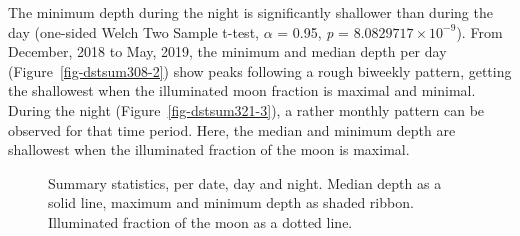 \documentclass[
  authoryear,
  review,
  3p]{elsarticle}
\begin{document}
The minimum depth during the night is significantly shallower than
during the day (one-sided Welch Two Sample t-test, \(\alpha\) = 0.95,
\emph{p} = \ensuremath{8.0829717\times 10^{-9}}). From December, 2018 to
May, 2019, the minimum and median depth per day
(Figure~\ref{fig-dstsum308-2}) show peaks following a rough biweekly
pattern, getting the shallowest when the illuminated moon fraction is
maximal and minimal. During the night (Figure~\ref{fig-dstsum321-3}), a
rather monthly pattern can be observed for that time period. Here, the
median and minimum depth are shallowest when the illuminated fraction of
the moon is maximal.

\begin{figure}

\begin{minipage}[t]{\linewidth}

{\centering 


}

\end{minipage}%
\newline
\begin{minipage}[t]{0.50\linewidth}

{\centering 


}

\end{minipage}%
%
\begin{minipage}[t]{0.50\linewidth}

{\centering 


}

\end{minipage}%

\caption{\label{fig-dstsum321}Summary statistics, per date, day and
night. Median depth as a solid line, maximum and minimum depth as shaded
ribbon. Illuminated fraction of the moon as a dotted line.}

\end{figure}
\end{document}
